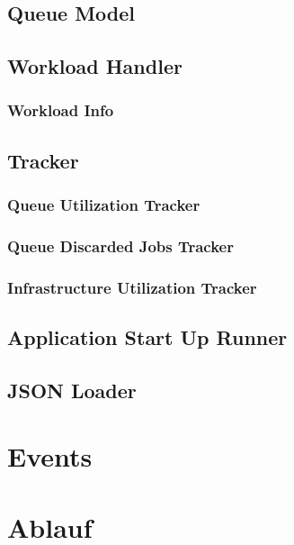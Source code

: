 \subsection{Queue Model}
\label{sec:aufbau:QueueModel}

\subsection{Workload Handler}

\subsubsection{Workload Info}


\subsection{Tracker}

\subsubsection{Queue Utilization Tracker}

\subsubsection{Queue Discarded Jobs Tracker}

\subsubsection{Infrastructure Utilization Tracker}

\subsection{Application Start Up Runner}

\subsection{JSON Loader}

\section{Events}
\label{sec:Aufbau:Events}


\section{Ablauf}



